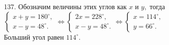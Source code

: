 137. Обозначим величины этих углов как $x$ и $y,$ тогда $\begin{cases} x+y=180^\circ,\\x-y=48^\circ.\end{cases}\Leftrightarrow
\begin{cases} 2x=228^\circ,\\x-y=48^\circ.\end{cases}\Leftrightarrow\begin{cases} x=114^\circ,\\y=66^\circ.\end{cases}$\\
Больший угол равен $114^\circ.$\\
